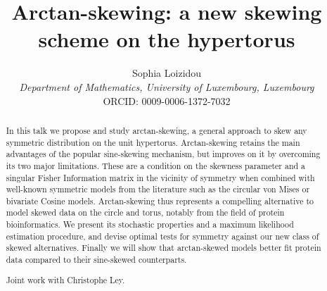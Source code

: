 \documentclass{article}
\title{Arctan-skewing: a new skewing scheme on the hypertorus}
\author{
  Sophia Loizidou\\
  \textit{Department of Mathematics, University of Luxembourg, Luxembourg}\\
  ORCID: 0009-0006-1372-7032
}
\date{}
\begin{document}
\maketitle

\begin{abstract}
In this talk we propose and study arctan-skewing, a general approach to skew any symmetric distribution on the unit hypertorus. 
Arctan-skewing retains the main advantages of the popular sine-skewing mechanism, but improves on it by overcoming its two major limitations. 
These are a condition on the skewness parameter and a singular Fisher Information matrix in the vicinity of symmetry when combined with well-known symmetric models from the literature such as the circular von Mises or bivariate Cosine models. 
Arctan-skewing thus represents a compelling alternative to model skewed data on the circle and torus, notably from the field of protein bioinformatics. 
We present its stochastic properties and a maximum likelihood estimation procedure, and devise optimal tests for symmetry against our new class of skewed alternatives. 
Finally we will show that arctan-skewed models better fit protein data compared to their sine-skewed counterparts.

Joint work with Christophe Ley.
\end{abstract}



\end{document}
